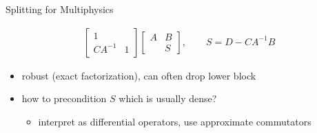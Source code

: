 \begin{frame}{Splitting for Multiphysics}
\begin{itemize}
\begin{align*}
      \begin{bmatrix}
        1 & \\ CA^{-1} & 1
      \end{bmatrix}
      \begin{bmatrix}
        A & B \\ & S
      \end{bmatrix}, \qquad
      S = D - C A^{-1} B
    \end{align*}
    \begin{itemize}
    \item robust (exact factorization), can often drop lower block
    \item how to precondition $S$ which is usually dense?
      \begin{itemize}
      \item interpret as differential operators, use approximate commutators
      \end{itemize}
    \end{itemize}
  \end{itemize}
\end{frame}
